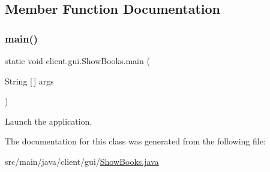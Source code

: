 \subsection{Member Function Documentation}
\mbox{\label{classclient_1_1gui_1_1_show_books_acb7c683c6a19a35f85878d376c8b210e}} 
\subsubsection{\texorpdfstring{main()}{main()}}
{\footnotesize\ttfamily static void client.\+gui.\+Show\+Books.\+main (\begin{DoxyParamCaption}\item[{String \mbox{[}$\,$\mbox{]}}]{args }\end{DoxyParamCaption})\hspace{0.3cm}{\ttfamily [static]}}

Launch the application. 

The documentation for this class was generated from the following file\+:\begin{DoxyCompactItemize}
\item 
src/main/java/client/gui/\hyperlink{_show_books_8java}{Show\+Books.\+java}\end{DoxyCompactItemize}
